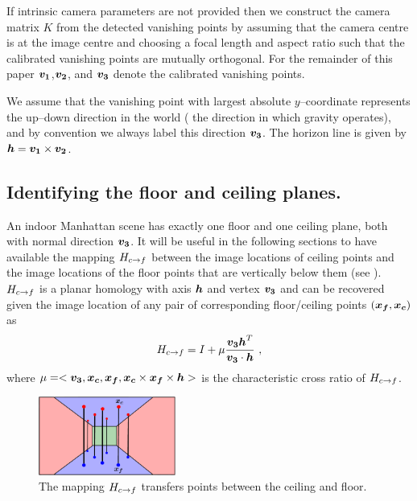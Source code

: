 If intrinsic camera parameters are not provided then we construct the
camera matrix $K$ from the detected vanishing points by assuming that
the camera centre is at the image centre and choosing a focal length
and aspect ratio such that the calibrated vanishing points are
mutually orthogonal. For the remainder of this paper
$\boldsymbol{v_1}$,$\boldsymbol{v_2}$, and $\boldsymbol{v_3}$ denote the calibrated
vanishing points.

We assume that the vanishing point with largest absolute
$y$--coordinate represents the up--down direction in the world (\ie
the direction in which gravity operates), and by convention we always
label this direction $\boldsymbol{v_3}$. The horizon line is given by
$\boldsymbol{h}=\boldsymbol{v_1}\times\boldsymbol{v_2}$.

\subsection{Identifying the floor and ceiling planes.}
\label{sect:fcmap}

An indoor Manhattan scene has exactly one floor and one ceiling plane,
both with normal direction $\boldsymbol{v_3}$. It will be useful in the
following sections to have available the mapping $H_{c \rightarrow f}$ between the
image locations of ceiling points and the image locations of the floor
points that are vertically below them (see ). $H_{c \rightarrow f}$ is
a planar homology with axis $\boldsymbol{h}$ and vertex $\boldsymbol{v_3}$
\cite{Criminisi01} and can be recovered given the image location of any
pair of corresponding floor/ceiling points $(\boldsymbol{x_f},\boldsymbol{x_c})$
as
\begin{equation}
  H_{c \rightarrow f} = I + \mu\frac{\boldsymbol{v_3}\boldsymbol{h}^T}{\boldsymbol{v_3} \cdot \boldsymbol{h}} ~,
\end{equation}
where $\mu = <\boldsymbol{v_3},\boldsymbol{x_c},\boldsymbol{x_f},
\boldsymbol{x_c}\times\boldsymbol{x_f}\times\boldsymbol{h}>$ is the characteristic cross
ratio of $H_{c \rightarrow f}$.

\begin{figure}[tb]
\centering
\includegraphics[width=0.4\textwidth]{figures/fcmap}
\caption{The mapping $H_{c \rightarrow f}$ transfers points between the ceiling and
  floor.}
\label{fig:fcmap}
\end{figure}

